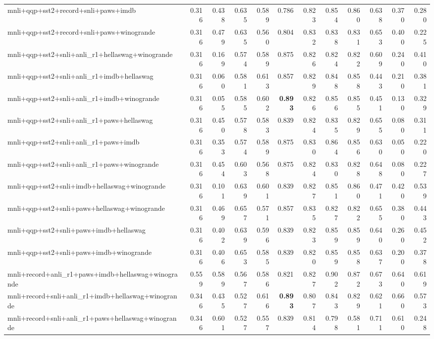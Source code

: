 \begin{table}[t]
\begin{tabular}{lrrrrrrrrrrr}
    mnli+qqp+sst2+record+snli+paws+imdb & 0.316 & 0.438 & 0.635 & 0.589 & 0.786 & 0.823 & 0.854 & 0.860 & 0.638 & 0.370 & 0.280 \\
    mnli+qqp+sst2+record+snli+paws+winogrande & 0.316 & 0.479 & 0.635 & 0.560 & 0.804 & 0.832 & 0.838 & 0.831 & 0.653 & 0.400 & 0.225 \\
    mnli+qqp+sst2+snli+anli\_r1+hellaswag+winogrande & 0.316 & 0.169 & 0.574 & 0.589 & 0.875 & 0.826 & 0.824 & 0.822 & 0.609 & 0.240 & 0.410 \\
    mnli+qqp+sst2+snli+anli\_r1+imdb+hellaswag & 0.316 & 0.060 & 0.581 & 0.613 & 0.857 & 0.829 & 0.848 & 0.858 & 0.443 & 0.210 & 0.381 \\
    mnli+qqp+sst2+snli+anli\_r1+imdb+winogrande & 0.316 & 0.055 & 0.585 & 0.602 & \textbf{0.893} & 0.826 & 0.856 & 0.855 & 0.451 & 0.130 & 0.329 \\
    mnli+qqp+sst2+snli+anli\_r1+paws+hellaswag & 0.316 & 0.450 & 0.578 & 0.583 & 0.839 & 0.824 & 0.835 & 0.829 & 0.655 & 0.080 & 0.311 \\
    mnli+qqp+sst2+snli+anli\_r1+paws+imdb & 0.316 & 0.353 & 0.574 & 0.589 & 0.875 & 0.830 & 0.864 & 0.856 & 0.630 & 0.050 & 0.220 \\
    mnli+qqp+sst2+snli+anli\_r1+paws+winogrande & 0.316 & 0.454 & 0.603 & 0.568 & 0.875 & 0.824 & 0.830 & 0.828 & 0.648 & 0.080 & 0.227 \\
    mnli+qqp+sst2+snli+imdb+hellaswag+winogrande & 0.316 & 0.101 & 0.639 & 0.601 & 0.839 & 0.827 & 0.851 & 0.860 & 0.471 & 0.420 & 0.539 \\
    mnli+qqp+sst2+snli+paws+hellaswag+winogrande & 0.316 & 0.469 & 0.657 & 0.571 & 0.857 & 0.835 & 0.827 & 0.822 & 0.655 & 0.380 & 0.443 \\
    mnli+qqp+sst2+snli+paws+imdb+hellaswag & 0.316 & 0.402 & 0.639 & 0.596 & 0.839 & 0.823 & 0.859 & 0.859 & 0.640 & 0.260 & 0.452 \\
    mnli+qqp+sst2+snli+paws+imdb+winogrande & 0.316 & 0.406 & 0.653 & 0.585 & 0.839 & 0.820 & 0.859 & 0.858 & 0.637 & 0.200 & 0.378 \\
    mnli+record+anli\_r1+paws+imdb+hellaswag+winogrande & 0.559 & 0.589 & 0.567 & 0.586 & 0.821 & 0.827 & 0.902 & 0.872 & 0.673 & 0.640 & 0.619 \\
    mnli+record+snli+anli\_r1+imdb+hellaswag+winogrande & 0.346 & 0.435 & 0.527 & 0.616 & \textbf{0.893} & 0.807 & 0.843 & 0.829 & 0.621 & 0.660 & 0.573 \\
    mnli+record+snli+anli\_r1+paws+hellaswag+winogrande & 0.346 & 0.601 & 0.527 & 0.557 & 0.839 & 0.814 & 0.798 & 0.581 & 0.711 & 0.610 & 0.248 \\

\end{tabular}
\end{table}
